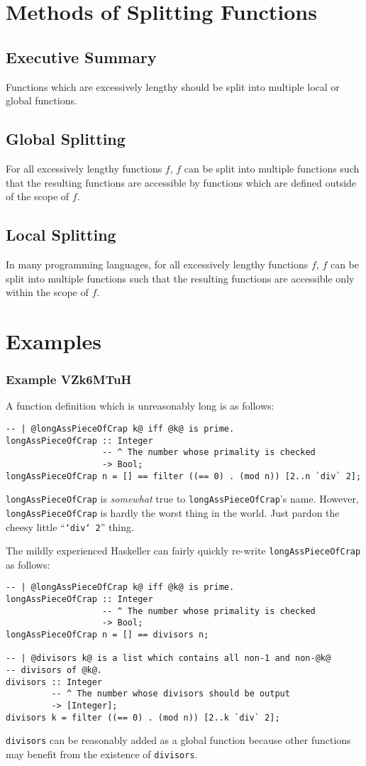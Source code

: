 \documentclass{report}
\begin{document}
\section{Methods of Splitting Functions}
\subsection{Executive Summary}
Functions which are excessively lengthy should be split into multiple local or global functions.
\subsection{Global Splitting}
For all excessively lengthy functions $f$, $f$ can be split into multiple functions such that the resulting functions are accessible by functions which are defined outside of the scope of $f$.
\subsection{Local Splitting}
In many programming languages, for all excessively lengthy functions $f$, $f$ can be split into multiple functions such that the resulting functions are accessible only within the scope of $f$.
\section{Examples}
\subsubsection{Example VZk6MTuH}
A function definition which is unreasonably long is as follows:
\begin{lstlisting}
-- | @longAssPieceOfCrap k@ iff @k@ is prime.
longAssPieceOfCrap :: Integer
                   -- ^ The number whose primality is checked
                   -> Bool;
longAssPieceOfCrap n = [] == filter ((== 0) . (mod n)) [2..n `div` 2];
\end{lstlisting}
\texttt{longAssPieceOfCrap} is \textit{somewhat} true to \texttt{longAssPieceOfCrap}'s name.  However, \texttt{longAssPieceOfCrap} is hardly the worst thing in the world.  Just pardon the cheesy little ``\texttt{`div` 2}'' thing.

The mildly experienced Haskeller can fairly quickly re-write \texttt{longAssPieceOfCrap} as follows:
\begin{lstlisting}
-- | @longAssPieceOfCrap k@ iff @k@ is prime.
longAssPieceOfCrap :: Integer
                   -- ^ The number whose primality is checked
                   -> Bool;
longAssPieceOfCrap n = [] == divisors n;

-- | @divisors k@ is a list which contains all non-1 and non-@k@
-- divisors of @k@.
divisors :: Integer
         -- ^ The number whose divisors should be output
         -> [Integer];
divisors k = filter ((== 0) . (mod n)) [2..k `div` 2];
\end{lstlisting}
\texttt{divisors} can be reasonably added as a global function because other functions may benefit from the existence of \texttt{divisors}.
\end{document}
